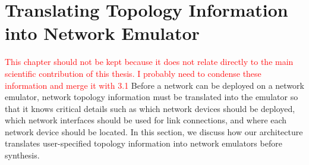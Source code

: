 \documentclass{uiucthesis2021}
\begin{document}
\section{Translating Topology Information into Network Emulator}
\noindent \textcolor{red}{This chapter should not be kept because it does not relate directly to the main scientific contribution of this thesis. I probably need to condense these information and merge it with 3.1}
\noindent Before a network can be deployed on a network emulator, network topology information must be translated into the emulator so that it knows critical details such as which network devices should be deployed, which network interfaces should be used for link connections, and where each network device should be located. In this section, we discuss how our architecture translates user-specified topology information into network emulators before synthesis. \\
\end{document}
